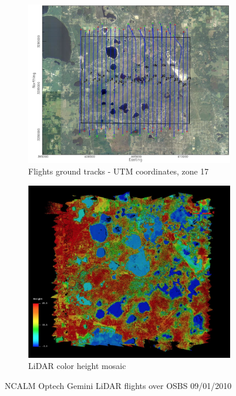 \documentclass[remotesensing,article,accept,moreauthors,pdftex,12pt,a4paper]{mdpi}
\begin{document}
\begin{figure}[t]
    \centering
    \begin{subfigure}[b]{0.4\textwidth}
        \centering
        \includegraphics[width=\textwidth]{./images/NCALM_flight_ground_tracks_OSBS_9_01_10.png}
        \caption{Flights ground tracks - UTM coordinates, zone 17}
        \label{fig:JPL_AVIRIS_flight_ground_tracks_OSBS_9_4_10}
    \end{subfigure}
    \hfill
    \begin{subfigure}[b]{0.4\textwidth}
        \centering
        \includegraphics[width=\textwidth]{./images/NCALM_Optech_Gemini_LiDAR_color_height_mosaic_OSBS_9_01_10.png}
        \caption{LiDAR color height mosaic}
        \label{fig:JPL_AVIRIS_true_color_mosaic_OSBS_9_4_10}
    \end{subfigure}
    
    \caption{NCALM Optech Gemini LiDAR flights over OSBS 09/01/2010 \cite{neon2010aopdatarelease}}
    \label{fig:lidar}
\end{figure}
\end{document}
